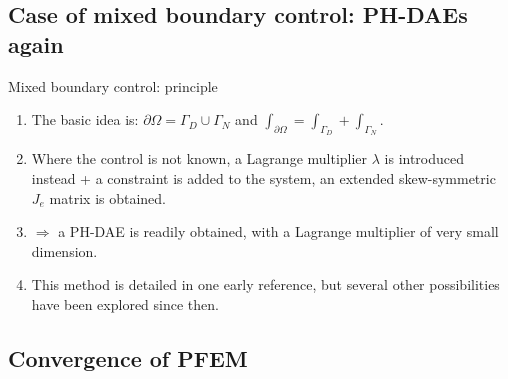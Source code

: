 \documentclass[10pt,aspectratio=43]{ISAE-Beamer}
\begin{document}
\subsection{Case of mixed boundary control: PH-DAEs again}
\begin{frame}{Mixed boundary control: principle}

  \begin{enumerate}
 \item The basic idea is: $\partial\Omega = \Gamma_D \cup \Gamma_N$
  and $\int_{\partial\Omega} = \int_{\Gamma_D} + \int_{\Gamma_N}$.

 \item Where the control is not known, a Lagrange multiplier $\lambda$ is introduced instead + a constraint is added to the system, an extended skew-symmetric $J_e$ matrix is obtained.
 
  \item $\Longrightarrow$ a PH-DAE is readily obtained, with a Lagrange multiplier of very small dimension.
  
  \item This method is detailed in one early reference, but  several other possibilities have been explored since then.
  \end{enumerate}
\end{frame}
\subsection{Convergence of PFEM}
\end{document}
